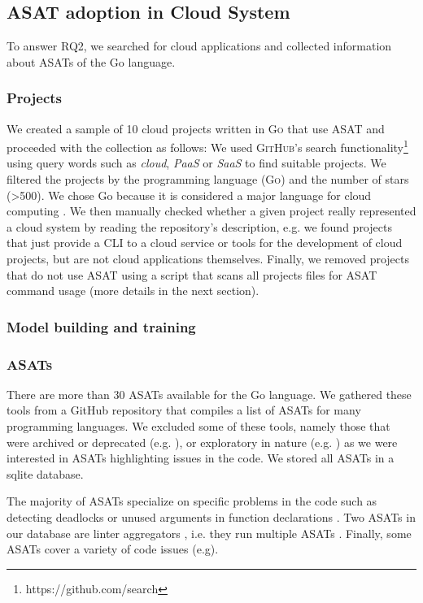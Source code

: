 \documentclass{seal_article}
\begin{document}
\subsection{ASAT adoption in Cloud System}
To answer RQ2, we searched for cloud applications and collected information about ASATs of the Go language. 

\subsubsection{Projects}
We created a sample of 10 cloud projects written in \textsc{Go} that use ASAT and proceeded with the collection as follows: We used \textsc{GitHub}'s search functionality\footnote{https://github.com/search} using query words such as \textit{cloud}, \textit{PaaS} or \textit{SaaS} to find suitable projects. We filtered the projects by the programming language (\textsc{Go}) and the number of stars (>500). We chose Go because it is considered a major language for cloud computing \cite{thenewstack}. We then manually checked whether a given project really represented a cloud system by reading the repository's description, e.g. we found projects that just provide a CLI to a cloud service or tools for the development of cloud projects, but are not cloud applications themselves. Finally, we removed projects that do not use ASAT using a script that scans all projects files for ASAT command usage (more details in the next section).

\subsubsection{Model building and training}



\subsubsection{ASATs}
There are more than 30 ASATs available for the Go language. We gathered these tools from a GitHub repository \cite{awesome_asat} that compiles a list of ASATs for many programming languages. We excluded some of these tools, namely those that were archived or deprecated (e.g. \cite{interfacer}), or exploratory in nature (e.g. \cite{goroutine}) as we were interested in ASATs highlighting issues in the code. We stored all ASATs in a sqlite database.

The majority of ASATs specialize on specific problems in the code such as detecting deadlocks \cite{dingo-hunter} or unused arguments in function declarations \cite{nargs}. Two ASATs in our database are linter aggregators , i.e. they run multiple ASATs \cite{goreporter,golangci-lint}. Finally, some ASATs cover a variety of code issues (e.g\cite{staticcheck}). 
\end{document}
